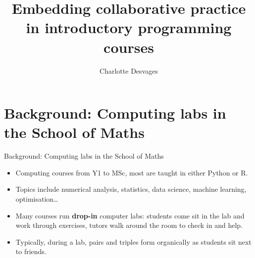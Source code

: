 \documentclass[aspectratio=169, 12pt]{beamer}
\title{Embedding collaborative practice in introductory programming courses}
\author{Charlotte Desvages}
\institute{School of Mathematics, University of Edinburgh, UK}
\begin{document}
\maketitle


\section{Background: Computing labs in the School of Maths}

\begin{frame}{Background: Computing labs in the School of Maths}
    \begin{itemize}
        \item<1-> Computing courses from Y1 to MSc, most are taught in either Python or R.
        \item<2-> Topics include numerical analysis, statistics, data science, machine learning, optimisation\ldots
        \item<3-> Many courses run \textbf{drop-in} computer labs: students come sit in the lab and work through exercises, tutors walk around the room to check in and help.
        \item<4-> Typically, during a lab, pairs and triples form organically as students sit next to friends.
    \end{itemize}
\end{frame}


\end{document}
